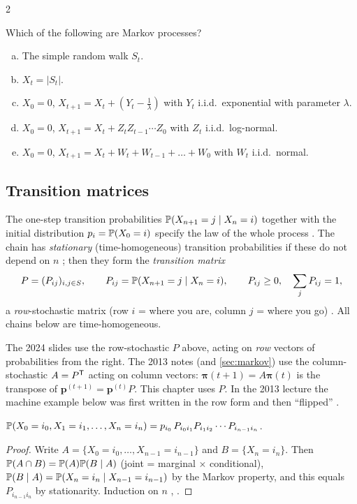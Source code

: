 \begin{paracol}{2}
\begin{exercise}
Which of the following are Markov processes?
\begin{enumerate}[(a)]
  \item The simple random walk $S_t$.
  \item $X_t=|S_t|$.
  \item $X_0=0$,
      $X_{t+1}=X_t+(Y_t-\tfrac1\lambda)$ with $Y_t$ i.i.d.\ exponential with parameter $\lambda$.
  \item $X_0=0$,
      $X_{t+1}=X_t+Z_tZ_{t-1}\cdots Z_0$ with $Z_t$ i.i.d.\ log-normal.
  \item $X_0=0$, $X_{t+1}=X_t+W_t+W_{t-1}+\dots+W_0$ with
      $W_t$ i.i.d.\ normal.
\end{enumerate}
\end{exercise}

\subsection{Transition matrices}
The one-step transition probabilities $\mathbb{P}(X_{n+1}=j\mid X_n=i)$ together with the initial
distribution $p_i=\mathbb{P}(X_0=i)$ specify the law of the whole process . The chain has
\emph{stationary} (time-homogeneous) transition probabilities if these do not depend on $n$
; then they form the \emph{transition matrix}
\[
  P=(P_{ij})_{i,j\in S},\qquad P_{ij}=\mathbb{P}(X_{n+1}=j\mid X_n=i),\qquad P_{ij}\ge0,\quad \sum_{j}P_{ij}=1,
\]
a \emph{row}-stochastic matrix (row $i$ = where you are, column $j$ = where you go) .
All chains below are time-homogeneous.

\begin{coursenote}
The 2024 slides use the row-stochastic $P$ above, acting on
\emph{row} vectors of probabilities from the right. The 2013 notes (and
\cref{sec:markov}) use the column-stochastic $A=P^{\mathsf T}$ acting on column
vectors: $\bm\pi(t+1)=A\bm\pi(t)$ is the transpose of
$\bm p^{(t+1)}=\bm p^{(t)}P$. This chapter uses $P$. In the 2013
lecture the machine example below was first written in the row form
and then ``flipped'' .
\end{coursenote}

\begin{proposition}\label{ch04:prop-path}
$\mathbb{P}(X_0=i_0,X_1=i_1,\dots,X_n=i_n)=p_{i_0}\,P_{i_0i_1}P_{i_1i_2}\cdots P_{i_{n-1}i_n}$.
\end{proposition}
\begin{proof}
Write $A=\{X_0=i_0,\dots,X_{n-1}=i_{n-1}\}$ and $B=\{X_n=i_n\}$. Then $\mathbb{P}(A\cap B)=\mathbb{P}(A)\mathbb{P}(B\mid A)$
(joint = marginal $\times$ conditional), $\mathbb{P}(B\mid A)=\mathbb{P}(X_n=i_n\mid X_{n-1}=i_{n-1})$ by the Markov
property, and this equals $P_{i_{n-1}i_n}$ by stationarity. Induction on $n$ , .
\end{proof}


\end{paracol}
